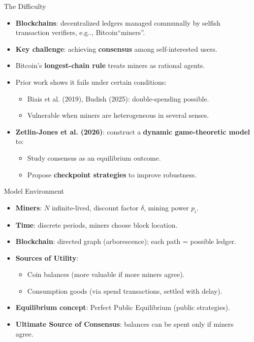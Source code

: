 \documentclass[aspectratio=169, 12pt]{beamer}
\begin{document}
\begin{frame}{The Difficulty}
    \begin{itemize}
        \item \textbf{Blockchains}: decentralized ledgers managed communally by selfish transaction verifiers, e.g.., Bitcoin``miners''.
        \item \textbf{Key challenge}: achieving \textbf{consensus} among self-interested users.
        \item Bitcoin’s \textbf{longest-chain rule} treats miners as rational agents.
        \item Prior work shows it fails under certain conditions:
        \begin{itemize}
            \item Biais et al. (2019), Budish (2025): double-spending possible.
            \item Vulnerable when miners are heterogeneous in several senses.
        \end{itemize}
        \item \textbf{ Zetlin-Jones et al. (2026)}: construct  a \textbf{dynamic game-theoretic model} to:
        \begin{itemize}
            \item Study consensus as an equilibrium outcome.
            \item Propose \textbf{checkpoint strategies} to improve robustness.
        \end{itemize}
    \end{itemize}
\end{frame}

\begin{frame}{Model Environment}
    \begin{itemize}
        \item \textbf{Miners}: \(N\) infinite-lived, discount factor \(\delta\), mining power \(p_i\).
        \item \textbf{Time}: discrete periods, miners choose block location.
        \item \textbf{Blockchain}: directed graph (arborescence); each path = possible ledger.
        \item \textbf{Sources of Utility}:
        \begin{itemize}
            \item Coin balances (more valuable if more miners agree).
            \item Consumption goods (via spend transactions, settled with delay).
        \end{itemize}
        \item \textbf{Equilibrium concept}: Perfect Public Equilibrium (public strategies).
        \item \textbf{Ultimate Source of Consensus}:  balances can be  spent only if miners agree. %
    \end{itemize}
\end{frame}
\end{document}
